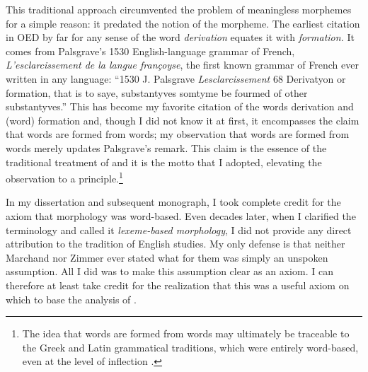 \documentclass[output=paper]{langsci/langscibook}
\begin{document}
This traditional approach circumvented the problem of meaningless
morphemes for a simple reason: it predated the notion of the morpheme.
The earliest citation in OED by far for any sense of the word
\emph{derivation} equates it with \emph{formation.} It comes from
Palsgrave's 1530 English-language grammar of French,
\emph{L'esclarcissement de la langue françoyse}, the first known grammar
of French ever written in any language: ``1530 J. Palsgrave
\emph{Lesclarcissement} 68 Derivatyon or formation, that is to saye,
substantyves somtyme be fourmed of other substantyves.'' This has become
my favorite citation of the words derivation and (word) formation and,
though I did not know it at first, it encompasses the claim that words
are formed from words; my observation that words are formed from words
merely updates Palsgrave's remark. This claim is the essence of the
traditional treatment of  and it is the motto that I
adopted, elevating the observation to a principle.\footnote{The idea
  that words are formed from words may ultimately be traceable to the
  Greek and Latin grammatical traditions, which were entirely
  word-based, even at the level of inflection %
\citep{Robins59}%
%
.}

\largerpage
In my dissertation and subsequent monograph, I took complete credit for
the axiom that morphology was word-based. Even decades later, when I
clarified the terminology and called it \emph{lexeme-based morphology},
I did not provide any direct attribution to the tradition of English
 studies. My only defense is that neither Marchand nor
Zimmer ever stated what for them was simply an unspoken assumption. All
I did was to make this assumption clear as an axiom. I can therefore at
least take credit for the realization that this was a useful axiom on
which to base the analysis of .
\end{document}
